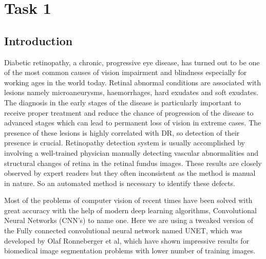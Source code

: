 \documentclass[conference]{IEEEtran}
\begin{document}
\section{Task 1}

\subsection{Introduction}
\par
Diabetic retinopathy, a chronic, progressive eye disease, has turned out to be one of the most common causes of vision impairment and blindness especially for working ages in the world today\cite{1}. Retinal abnormal conditions are associated with lesions namely microaneurysms, haemorrhages, hard exudates and soft exudates. The diagnosis in the early stages of the disease is particularly important to receive proper treatment and reduce the chance of progression of the disease to advanced stages which can lead to permanent loss of vision in extreme cases\cite{2}. The presence of these lesions is highly correlated with DR, so detection of their presence is crucial. Retinopathy detection system is usually accomplished by involving a well-trained physician manually detecting vascular abnormalities and structural changes of retina in the retinal fundus images. These results are closely observed by expert readers but they often inconsistent as the method is manual in nature\cite{8}. So an automated method is necessary to identify these defects. 
\par
Most of the problems of computer vision of recent times have been solved with great accuracy with the help of modern deep learning algorithms, Convolutional Neural Networks (CNN's) to name one. Here we are using a tweaked version of the Fully connected convolutional neural network named UNET, which was developed by Olaf Ronneberger et al\cite{unet}, which have shown impressive results for biomedical image segmentation problems with lower number of training images.
\end{document}
